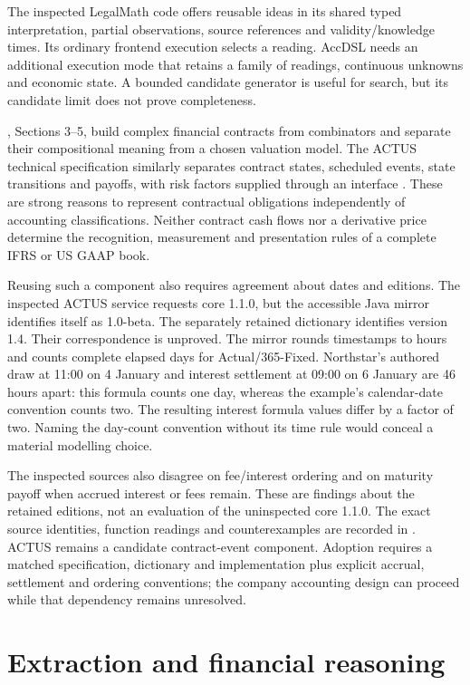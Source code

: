 The inspected LegalMath code offers reusable ideas in its shared typed
interpretation, partial observations, source references and validity/knowledge
times. Its ordinary frontend execution selects a reading. AccDSL needs an
additional execution mode that retains a family of readings, continuous
unknowns and economic state. A bounded candidate generator is useful for
search, but its candidate limit does not prove completeness.

\citet{jones2000}, Sections 3--5, build complex financial contracts from
combinators and separate their compositional meaning from a chosen valuation
model. The ACTUS technical specification similarly separates contract states,
scheduled events, state transitions and payoffs, with risk factors supplied
through an interface \citep{actus}. These are strong reasons to represent
contractual obligations independently of accounting classifications. Neither
contract cash flows nor a derivative price determine the recognition,
measurement and presentation rules of a complete IFRS or US GAAP book.

Reusing such a component also requires agreement about dates and editions.
The inspected ACTUS service requests core 1.1.0, but the accessible Java
mirror identifies itself as 1.0-beta. The separately retained dictionary
identifies version 1.4. Their correspondence is unproved. The mirror rounds
timestamps to hours and counts complete elapsed days for Actual/365-Fixed.
Northstar's authored draw at 11:00 on 4 January and interest settlement at
09:00 on 6 January are 46 hours apart: this formula counts one day, whereas
the example's calendar-date convention counts two. The resulting interest
formula values differ by a factor of two. Naming the day-count convention
without its time rule would conceal a material modelling choice.

The inspected sources also disagree on fee/interest ordering and on maturity
payoff when accrued interest or fees remain. These are findings about the
retained editions, not an evaluation of the uninspected core 1.1.0. The exact
source identities, function readings and counterexamples are recorded in
. ACTUS
remains a candidate contract-event component. Adoption requires a matched
specification, dictionary and implementation plus explicit accrual, settlement
and ordering conventions; the company accounting design can proceed while
that dependency remains unresolved.

\section{Extraction and financial reasoning}


